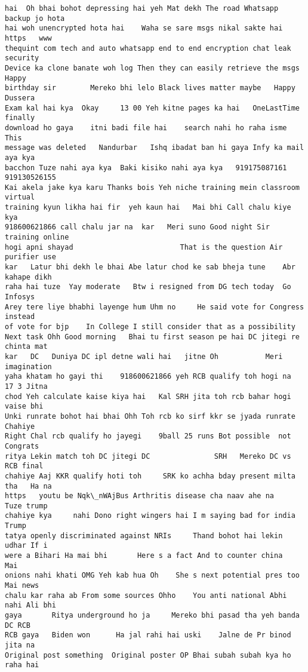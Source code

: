 \documentclass[11pt]{article}
\begin{document}
\begin{tcolorbox}[breakable, size=fbox, boxrule=.5pt, pad at break*=1mm, opacityfill=0]
\begin{Verbatim}[commandchars=\\\{\}]
hai  Oh bhai bohot depressing hai yeh Mat dekh The road Whatsapp backup jo hota
hai woh unencrypted hota hai    Waha se sare msgs nikal sakte hai https   www
thequint com tech and auto whatsapp end to end encryption chat leak security
Device ka clone banate woh log Then they can easily retrieve the msgs Happy
birthday sir        Mereko bhi lelo Black lives matter maybe   Happy Dussera
Exam kal hai kya  Okay     13 00 Yeh kitne pages ka hai   OneLastTime finally
download ho gaya    itni badi file hai    search nahi ho raha isme        This
message was deleted   Nandurbar   Ishq ibadat ban hi gaya Infy ka mail aya kya
bacchon Tuze nahi aya kya  Baki kisiko nahi aya kya   919175087161  919130526155
Kai akela jake kya karu Thanks bois Yeh niche training mein classroom virtual
training kyun likha hai fir  yeh kaun hai   Mai bhi Call chalu kiye kya
918600621866 call chalu jar na  kar   Meri suno Good night Sir training online
hogi apni shayad                         That is the question Air purifier use
kar   Latur bhi dekh le bhai Abe latur chod ke sab bheja tune    Abr kahape dikh
raha hai tuze  Yay moderate   Btw i resigned from DG tech today  Go Infosys
Arey tere liye bhabhi layenge hum Uhm no     He said vote for Congress instead
of vote for bjp    In College I still consider that as a possibility
Next task Ohh Good morning   Bhai tu first season pe hai DC jitegi re chinta mat
kar   DC   Duniya DC ipl detne wali hai   jitne Oh           Meri imagination
yaha khatam ho gayi thi    918600621866 yeh RCB qualify toh hogi na  17 3 Jitna
chod Yeh calculate kaise kiya hai   Kal SRH jita toh rcb bahar hogi vaise bhi
Unki runrate bohot hai bhai Ohh Toh rcb ko sirf kkr se jyada runrate Chahiye
Right Chal rcb qualify ho jayegi    9ball 25 runs Bot possible  not Congrats
ritya Lekin match toh DC jitegi DC               SRH   Mereko DC vs RCB final
chahiye Aaj KKR qualify hoti toh     SRK ko achha bday present milta tha   Ha na
https   youtu be Nqk\_nWAjBus Arthritis disease cha naav ahe na    Tuze trump
chahiye kya     nahi Dono right wingers hai I m saying bad for india   Trump
tatya openly discriminated against NRIs     Thand bohot hai lekin udhar If i
were a Bihari Ha mai bhi       Here s a fact And to counter china      Mai
onions nahi khati OMG Yeh kab hua Oh    She s next potential pres too Mai news
chalu kar raha ab From some sources Ohho    You anti national Abhi nahi Ali bhi
gaya       Ritya underground ho ja     Mereko bhi pasad tha yeh banda DC RCB
RCB gaya   Biden won      Ha jal rahi hai uski    Jalne de Pr binod jita na
Original post something  Original poster OP Bhai subah subah kya ho raha hai

\end{Verbatim}
\end{tcolorbox}
\end{document}
